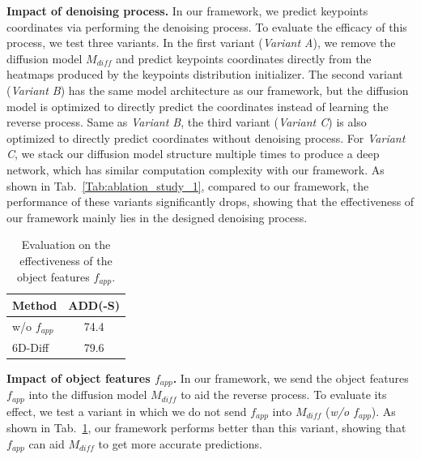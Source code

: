 \documentclass[10pt,twocolumn,letterpaper]{article}
\begin{document}
\noindent\textbf{Impact of denoising process.} 
In our framework, we predict keypoints coordinates via performing the denoising process.
To evaluate the efficacy of this process, we test three variants.  
In the first variant (\textit{Variant A}), we remove the diffusion model $M_{diff}$ and predict keypoints coordinates directly from the heatmaps produced by the keypoints distribution initializer.
The second variant (\textit{Variant B}) has the same model architecture as our framework, but the diffusion model is optimized to directly predict the coordinates instead of learning the reverse process.
Same as \textit{Variant B}, the third variant (\textit{Variant C}) is also optimized to directly predict coordinates without denoising process.
For \textit{Variant C}, we stack our diffusion model structure multiple times to produce a deep network, which has similar computation complexity with our framework.
As shown in Tab.~\ref{Tab:ablation_study_1}, compared to our framework, the performance of these variants significantly drops, showing that the effectiveness of our framework mainly lies in the designed denoising process.

\begin{table}
\vspace{-0.35cm}
\caption{Evaluation on the effectiveness of the object features $f_{app}$.}
\vspace{-0.35cm}
\resizebox{0.4\columnwidth}{!}
{
\small
\begin{tabular}{l|c}
\hline
Method & ADD(-S)\\
\hline
w/o $f_{app}$ & 74.4\\
\hline
6D-Diff & 79.6 \\
\hline
\end{tabular}}
\label{Tab:ablation_study_4}
\end{table}

\noindent\textbf{Impact of object features $f_{app}$.} 
In our framework,  we send the object features $f_{app}$ 
into the diffusion model $M_{diff}$ to aid the reverse process.
To evaluate its effect, we test a variant in which we do not send $f_{app}$ into $M_{diff}$ (\textit{w/o $f_{app}$}). 
As shown in Tab.~\ref{Tab:ablation_study_4}, our framework performs better than this variant, 
showing that $f_{app}$ can aid $M_{diff}$ to get more accurate predictions.
\end{document}
